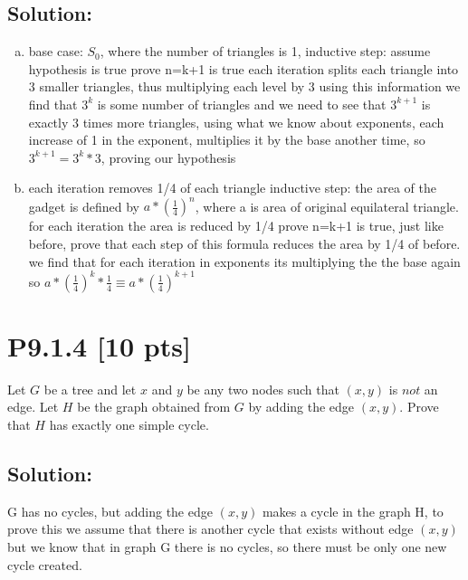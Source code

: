 \documentclass[12pt]{article}
\begin{document}
\subsection*{\textbf{Solution:}}
\begin{enumerate}[(a)]
    \item 
base case: $S_0$, where the number of triangles is 1, 
\newline inductive step: assume hypothesis is true
\newline prove n=k+1 is true
\newline each iteration splits each triangle into 3 smaller triangles, thus multiplying each level by 3
\newline using this information we find that $3^k$ is some number of triangles and we need to see that $3^{k+1}$ is exactly 3 times more triangles, using what we know about exponents, each increase of 1 in the exponent, multiplies it by the base another time, so $3^{k+1}=3^k*3$, proving our hypothesis
    \item each iteration removes 1/4 of each triangle
\newline inductive step: the area of the gadget is defined by $a*(\frac{1}{4})^n$, where a is area of original equilateral triangle. \newline for each iteration the area is reduced by 1/4
\newline prove n=k+1 is true,
\newline just like before, prove that each step of this formula reduces the area by 1/4 of before. we find that for each iteration in exponents its multiplying the the base again so $a*(\frac{1}{4})^k*\frac{1}{4} \equiv a*(\frac{1}{4})^{k+1}$
\end{enumerate}



\newpage
\section*{\textbf{P9.1.4} [10 pts]}
 Let $G$ be a tree and let $x$ and $y$ be any two nodes such that $(x, y)$ is $not$ an edge. Let $H$ be the graph obtained from $G$ by adding the edge $(x, y)$. Prove that $H$ has exactly one simple cycle.

\subsection*{\textbf{Solution:}}
G has no cycles, but adding the edge $(x,y)$ makes a cycle in the graph H, to prove this we assume that there is another cycle that exists without edge $(x,y)$ but we know that in graph G there is no cycles, so there must be only one new cycle created.
\end{document}
